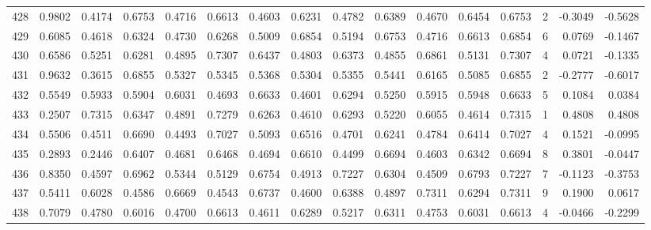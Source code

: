 \begin{tabular}{lrrrrrrrrrrrrrrr}
428 &      0.9802 &  0.4174 &  0.6753 &  0.4716 &  0.6613 &  0.4603 &  0.6231 &  0.4782 &  0.6389 &  0.4670 &   0.6454 &     0.6753 &      2 &                   -0.3049 &                    -0.5628 \\
429 &      0.6085 &  0.4618 &  0.6324 &  0.4730 &  0.6268 &  0.5009 &  0.6854 &  0.5194 &  0.6753 &  0.4716 &   0.6613 &     0.6854 &      6 &                    0.0769 &                    -0.1467 \\
430 &      0.6586 &  0.5251 &  0.6281 &  0.4895 &  0.7307 &  0.6437 &  0.4803 &  0.6373 &  0.4855 &  0.6861 &   0.5131 &     0.7307 &      4 &                    0.0721 &                    -0.1335 \\
431 &      0.9632 &  0.3615 &  0.6855 &  0.5327 &  0.5345 &  0.5368 &  0.5304 &  0.5355 &  0.5441 &  0.6165 &   0.5085 &     0.6855 &      2 &                   -0.2777 &                    -0.6017 \\
432 &      0.5549 &  0.5933 &  0.5904 &  0.6031 &  0.4693 &  0.6633 &  0.4601 &  0.6294 &  0.5250 &  0.5915 &   0.5948 &     0.6633 &      5 &                    0.1084 &                     0.0384 \\
433 &      0.2507 &  0.7315 &  0.6347 &  0.4891 &  0.7279 &  0.6263 &  0.4610 &  0.6293 &  0.5220 &  0.6055 &   0.4614 &     0.7315 &      1 &                    0.4808 &                     0.4808 \\
434 &      0.5506 &  0.4511 &  0.6690 &  0.4493 &  0.7027 &  0.5093 &  0.6516 &  0.4701 &  0.6241 &  0.4784 &   0.6414 &     0.7027 &      4 &                    0.1521 &                    -0.0995 \\
435 &      0.2893 &  0.2446 &  0.6407 &  0.4681 &  0.6468 &  0.4694 &  0.6610 &  0.4499 &  0.6694 &  0.4603 &   0.6342 &     0.6694 &      8 &                    0.3801 &                    -0.0447 \\
436 &      0.8350 &  0.4597 &  0.6962 &  0.5344 &  0.5129 &  0.6754 &  0.4913 &  0.7227 &  0.6304 &  0.4509 &   0.6793 &     0.7227 &      7 &                   -0.1123 &                    -0.3753 \\
437 &      0.5411 &  0.6028 &  0.4586 &  0.6669 &  0.4543 &  0.6737 &  0.4600 &  0.6388 &  0.4897 &  0.7311 &   0.6294 &     0.7311 &      9 &                    0.1900 &                     0.0617 \\
438 &      0.7079 &  0.4780 &  0.6016 &  0.4700 &  0.6613 &  0.4611 &  0.6289 &  0.5217 &  0.6311 &  0.4753 &   0.6031 &     0.6613 &      4 &                   -0.0466 &                    -0.2299 \\

\end{tabular}

